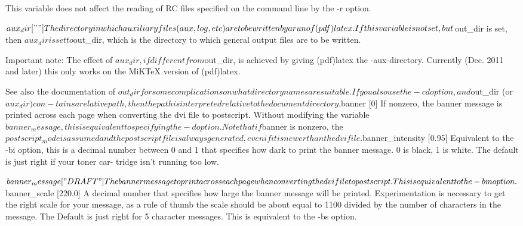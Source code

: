               This  variable does not affect the reading of RC files specified
              on the command line by the -r option.

       $aux_dir [""]
              The directory in which auxiliary files (aux, log, etc) are to be
              written  by  a  run of (pdf)latex.  If this variable is not set,
              but $out_dir is set, then $aux_dir is set to $out_dir, which  is
              the directory to which general output files are to be written.

              Important  note:   The  effect  of  $aux_dir,  if different from
              $out_dir, is achieved by giving (pdf)latex  the  -aux-directory.
              Currently  (Dec.  2011  and later) this only works on the MiKTeX
              version of (pdf)latex.

              See also the documentation of $out_dir for some complications on
              what directory names are suitable.

              If  you also use the -cd option, and $out_dir (or $aux_dir) con-
              tains a relative path, then the path is interpreted relative  to
              the document directory.

       $banner [0]
              If  nonzero, the banner message is printed across each page when
              converting the dvi file to postscript.   Without  modifying  the
              variable  $banner_message,  this is equivalent to specifying the
              -d option.

              Note that if $banner is nonzero, the $postscript_mode is assumed
              and the postscript file is always generated, even if it is newer
              than the dvi file.

       $banner_intensity [0.95]
              Equivalent to the -bi option, this is a decimal number between 0
              and  1 that specifies how dark to print the banner message. 0 is
              black, 1 is white.  The default is just right if your toner car-
              tridge isn't running too low.

       $banner_message ["DRAFT"]
              The banner message to print across each page when converting the
              dvi file to postscript.  This is equivalent to the -bm option.

       $banner_scale [220.0]
              A decimal number that specifies how  large  the  banner  message
              will  be printed.  Experimentation is necessary to get the right
              scale for your message, as a rule of thumb the scale  should  be
              about  equal  to 1100 divided by the number of characters in the
              message.  The Default is just right for  5  character  messages.
              This is equivalent to the -bs option.

